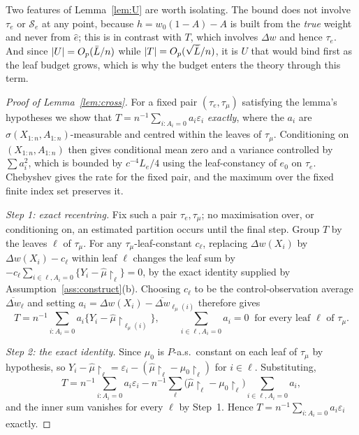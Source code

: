 \documentclass[11pt]{article}
\theoremstyle{plain}
\theoremstyle{definition}
\theoremstyle{remark}
\newcommand{\cS}{\mathcal{S}}
\newcommand{\ez}{e_0}
\newcommand{\mz}{\mu_0}
\newcommand{\wz}{w_0}
\newcommand{\ehat}{\widehat{e}}
\newcommand{\mhat}{\widehat{\mu}}
\DeclarePairedDelimiter{\abs}{\lvert}{\rvert}
\begin{document}
\noindent Two features of Lemma~\ref{lem:U} are worth isolating. The bound does
not involve $\tau_e$ or $\cS_e$ at any point, because $h=\wz(1-A)-A$ is built
from the \emph{true} weight and never from $\ehat$; this is in contrast with $T$,
which involves $\Delta w$ and hence $\tau_e$. And since
$\abs U=O_p(\bar L/n)$ while $\abs T=O_p(\sqrt{\bar L}/n)$, it is $U$ that would bind
first as the leaf budget grows, which is why the budget enters the theory through
this term.

\begin{proof}[Proof of Lemma~\ref{lem:cross}]
For a fixed pair $(\tau_e,\tau_\mu)$ satisfying the lemma's hypotheses we
show that $T=n^{-1}\sum_{i:A_i=0}a_i\varepsilon_i$ \emph{exactly}, where the
$a_i$ are $\sigma(X_{1:n},A_{1:n})$-measurable and centred within the leaves
of $\tau_\mu$. Conditioning on $(X_{1:n},A_{1:n})$ then gives conditional
mean zero and a variance controlled by $\sum a_i^2$, which is bounded by
$c^{-4}L_e/4$ using the leaf-constancy of $\ez$ on $\tau_e$. Chebyshev gives
the rate for the fixed pair, and the maximum over the fixed finite index set
preserves it.

\emph{Step 1: exact recentring.} Fix such a pair $\tau_e,\tau_\mu$; no
maximisation over, or conditioning on, an estimated partition occurs until
the final step. Group $T$ by the leaves $\ell$ of $\tau_\mu$. For any
$\tau_\mu$-leaf-constant $c_\ell$, replacing $\Delta w(X_i)$ by
$\Delta w(X_i)-c_\ell$ within leaf $\ell$ changes the leaf sum by
$-c_\ell\sum_{i\in\ell,A_i=0}\{Y_i-\mhat\restriction_\ell\}=0$, by the exact
identity supplied by Assumption~\ref{ass:construct}(b). Choosing $c_\ell$ to be
the control-observation average $\overline{\Delta w}_\ell$ and setting
$a_i=\Delta w(X_i)-\overline{\Delta w}_{\ell_\mu(i)}$ therefore gives
\[
  T=n^{-1}\sum_{i:A_i=0}a_i\bigl\{Y_i-\mhat\restriction_{\ell_\mu(i)}\bigr\},
  \qquad
  \sum_{i\in\ell,A_i=0}a_i=0\ \text{ for every leaf }\ell\text{ of }\tau_\mu.
\]

\emph{Step 2: the exact identity.} Since $\mz$ is $P$-a.s.\ constant on each
leaf of $\tau_\mu$ by hypothesis, so
$Y_i-\mhat\restriction_\ell
=\varepsilon_i-(\mhat\restriction_\ell-\mz\restriction_\ell)$ for $i\in\ell$.
Substituting,
\[
  T=n^{-1}\sum_{i:A_i=0}a_i\varepsilon_i
   -n^{-1}\sum_{\ell}\bigl(\mhat\restriction_\ell-\mz\restriction_\ell\bigr)
    \sum_{i\in\ell,A_i=0}a_i ,
\]
and the inner sum vanishes for every $\ell$ by Step~1. Hence
$T=n^{-1}\sum_{i:A_i=0}a_i\varepsilon_i$ exactly.


\end{proof}
\end{document}
